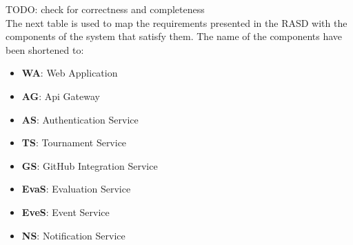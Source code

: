 TODO: check for correctness and completeness\\
The next table is used to map the requirements presented in the RASD with the components of the system that satisfy them. The name of the components have been shortened to:
\begin{itemize}
    \item \textbf{WA}: Web Application
    \item \textbf{AG}: Api Gateway
    \item \textbf{AS}: Authentication Service
    \item \textbf{TS}: Tournament Service
    \item \textbf{GS}: GitHub Integration Service
    \item \textbf{EvaS}: Evaluation Service
    \item \textbf{EveS}: Event Service
    \item \textbf{NS}: Notification Service
\end{itemize}

